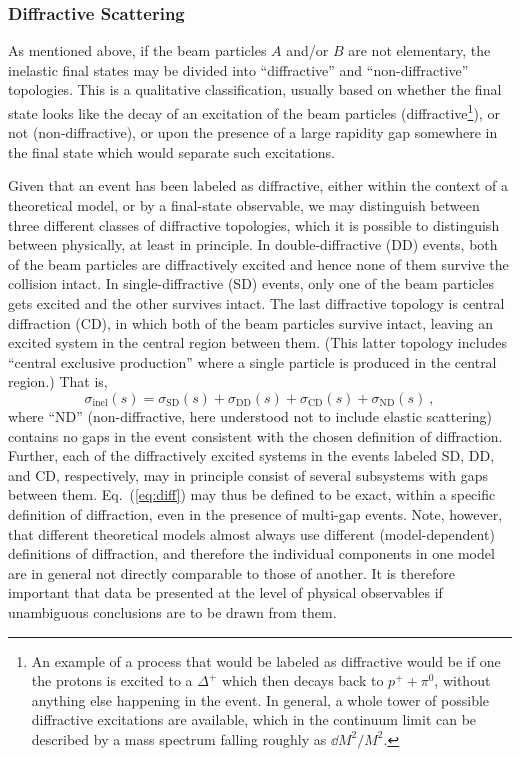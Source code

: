 \subsubsection{Diffractive Scattering \label{sec:diffraction}}
%
As mentioned above, if the beam particles $A$ and/or $B$ are not
elementary, the inelastic final states may be 
 divided into ``diffractive'' and ``non-diffractive''
topologies. This is a qualitative classification, usually based on
whether the final state looks like
the decay of an excitation of the beam particles 
(diffractive\footnote{An example of a process that would be labeled as
  diffractive would be if one the protons is excited to a
$\Delta^+$ which then decays back to $p^++\pi^0$, without anything else
  happening in the event.  In
  general, a whole tower of possible diffractive excitations are
  available, which in the continuum limit can be described by a mass
  spectrum falling roughly as $\dd{M^2}/M^2$.}), 
or not (non-diffractive), or upon the presence of a
large rapidity gap somewhere in the final state which would separate
such excitations. 

Given that an event has been labeled as diffractive, either within the
context of a theoretical model, or by a final-state observable, 
we may distinguish
between three different classes of diffractive topologies, which it is
possible to distinguish between physically, at least in principle. 
In double-diffractive (DD) events, both of the beam particles are
diffractively excited and hence none of them survive the collision
intact. In single-diffractive (SD) events, only one of the beam
particles gets excited and the other survives intact. The last 
diffractive topology is  central diffraction (CD),  in which 
both of the beam particles survive intact, leaving an excited system
in the central region between them. (This latter topology includes
``central exclusive production'' where a single particle is produced
in the central region.)  
That is,  
\begin{equation}
\sigma_{\mathrm{inel}}(s) = 
\sigma_{\mathrm{SD} }(s)
+
\sigma_{\mathrm{DD}}(s) +
\sigma_{\mathrm{CD}}(s) + 
\sigma_{\mathrm{ND}}(s) ~, \label{eq:diff}
\end{equation}
where ``ND'' (non-diffractive, here understood not to include elastic
scattering) contains no gaps in the event
consistent with the chosen definition of diffraction. Further, 
each of the diffractively excited systems in the events labeled SD,
DD, and CD, respectively, may in principle consist of
several subsystems with gaps between them. Eq.~(\ref{eq:diff}) may 
thus be defined to be exact, within a specific definition of
diffraction, even in the presence of multi-gap events. 
Note, however, that different
theoretical models almost always use different (model-dependent) definitions of
diffraction, and therefore the individual components in one model are
in general not directly comparable to those of another. It is
therefore important that data be presented at the level of physical
observables if unambiguous conclusions are to be drawn from them.

